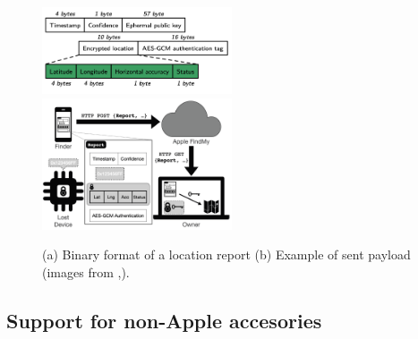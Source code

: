 \documentclass[english]{article}
\begin{document}
\begin{figure}
	\centering
	\includegraphics[width=0.5\textwidth]{images/packet.png}\hfill 
	\includegraphics[width=0.5\textwidth]{images/findmysec.png}
	\caption{(a) Binary format of a location report \quad (b) Example of sent payload (images from \cite{whocanfind},\cite{airguard}).}
	\label{comparison}
\end{figure}

\subsection{Support for non-Apple accesories} 
\end{document}
